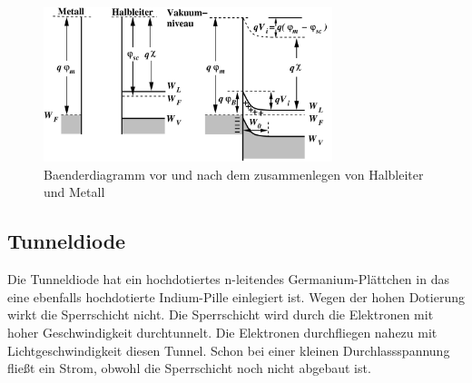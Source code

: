 \begin{figure}[h]
    \centering
    \includegraphics[width=0.75\textwidth]{fig/baenderSchottky}
    \caption{Baenderdiagramm vor und nach dem zusammenlegen von Halbleiter und Metall}
    \label{fig:baenderSchottky}
\end{figure}

\subsection{Tunneldiode }\label{k5:tunnelDiode}
Die Tunneldiode hat ein hochdotiertes n-leitendes Germanium-Plättchen in das eine ebenfalls hochdotierte Indium-Pille einlegiert ist.
Wegen der hohen Dotierung wirkt die Sperrschicht nicht. Die Sperrschicht wird durch die Elektronen mit hoher Geschwindigkeit durchtunnelt. Die Elektronen durchfliegen nahezu mit Lichtgeschwindigkeit diesen Tunnel. Schon bei einer kleinen Durchlassspannung fließt ein Strom, obwohl die Sperrschicht noch nicht abgebaut ist.

